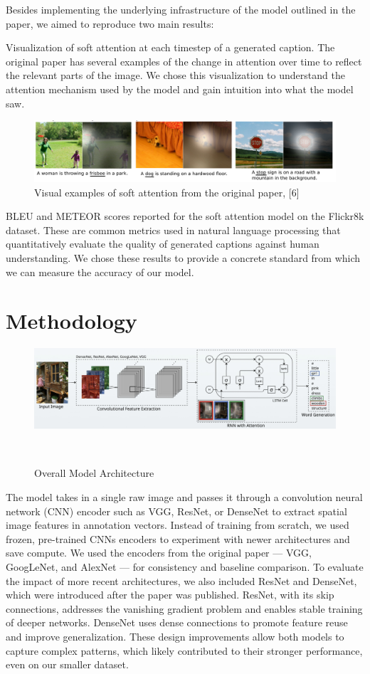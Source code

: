 \documentclass{article}
\begin{document}
Besides implementing the underlying infrastructure of the model outlined in the paper, we aimed to reproduce two main results:

Visualization of soft attention at each timestep of a generated caption. The original paper has several examples of the change in attention over time to reflect the relevant parts of the image. We chose this visualization to understand the attention mechanism used by the model and gain intuition into what the model saw.

\begin{figure}[h]
    \centering
    \includegraphics[width=0.9\linewidth]{chosen-results.png}
    \caption{Visual examples of soft attention from the original paper, [6]}
    \label{fig:results}
\end{figure}

BLEU and METEOR scores reported for the soft attention model on the Flickr8k dataset. These are common metrics used in natural language processing that quantitatively evaluate the quality of generated captions against human understanding. We chose these results to provide a concrete standard from which we can measure the accuracy of our model.


\section{Methodology}
\begin{figure}[h]
    \centering
    \includegraphics[scale=0.2]{methodology.png}
    \caption{Overall Model Architecture}
    \
\end{figure}
The model takes in a single raw image and passes it through a convolution neural network (CNN) encoder such as VGG, ResNet, or DenseNet to extract spatial image features in annotation vectors. Instead of training from scratch, we used frozen, pre-trained CNNs encoders to experiment with newer architectures and save compute. We used the encoders from the original paper --- VGG, GoogLeNet, and AlexNet --- for consistency and baseline comparison. To evaluate the impact of more recent architectures, we also included ResNet and DenseNet, which were introduced after the paper was published. ResNet, with its skip connections, addresses the vanishing gradient problem and enables stable training of deeper networks. DenseNet uses dense connections to promote feature reuse and improve generalization. These design improvements allow both models to capture complex patterns, which likely contributed to their stronger performance, even on our smaller dataset.
\end{document}
